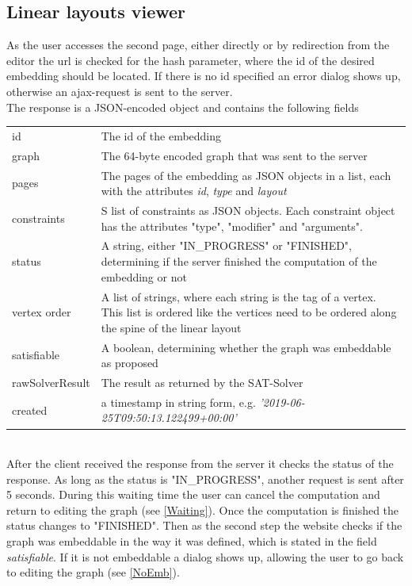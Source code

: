 {\subsection{Linear layouts viewer}
\label{viewerOV}
As the user accesses the second page, either directly or by redirection from the editor the url is checked for the hash parameter, where the id of the desired embedding should be located. If there is no id specified an error dialog shows up, otherwise an ajax-request is sent to the server.\\
The response is a JSON-encoded object and contains the following fields \cite{linearLayoutApi}\\[12pt]
\begin{tabular}{l p{}}
id & The id of the embedding\\
graph & The 64-byte encoded graph that was sent to the server\\
pages & The pages of the embedding as JSON objects in a list, each with the attributes \textit{id}, \textit{type} and \textit{layout}\\
constraints & S list of constraints as JSON objects. Each constraint object has the attributes "type", "modifier" and "arguments".\\
status & A string, either "IN\_PROGRESS" or "FINISHED", determining if the server finished the computation of the embedding or not\\
vertex order & A list of strings, where each string is the tag of a vertex. This list is ordered like the vertices need to be ordered along the spine of the linear layout\\
satisfiable & A boolean, determining whether the graph was embeddable as proposed\\
rawSolverResult & The result as returned by the SAT-Solver\\
created & a timestamp in string form, e.g. \textit{'2019-06-25T09:50:13.122499+00:00'}
\end{tabular}\\[12pt]
After the client received the response from the server it checks the status of the response. As long as the status is "IN\_PROGRESS", another request is sent after 5 seconds. During this waiting time the user can cancel the computation and return to editing the graph (see \autoref{Waiting}). Once the computation is finished the status changes to "FINISHED". Then as the second step the website checks if the graph was embeddable in the way it was defined, which is stated in the field \textit{satisfiable}. If it is not embeddable a dialog shows up, allowing the user to go back to editing the graph (see \autoref{NoEmb}).\\
}
